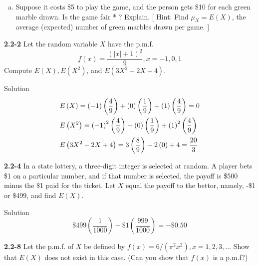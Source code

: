 \documentclass{article}
\begin{document}
\begin{spacing}{1.1}
\begin{homeworkProblem}
\begin{enumerate}[(a)]
\begin{homeworkSection}{Solution}
			\end{homeworkSection}
		\item Suppose it costs \$5 to play the game, and the person gets \$10 for each green marble
drawn. Is the game fair * ? Explain. [ Hint: Find  $\mu_X = E(X)$, the average (expected) number of green marbles drawn per game. ]
	\end{enumerate}
\end{homeworkProblem}
\begin{homeworkProblem}
	{\bf 2.2-2}	Let the random variable $X$ have the p.m.f. 
	\[f\left( x \right) = \frac{{{{\left( {\left| x \right| + 1} \right)}^2}}}{9},x =  - 1,0,1\]
	Compute $E(X),E(X^2)$, and $E(3X^2 - 2X +4)$.
	\begin{homeworkSection}{Solution}
		\[\begin{gathered}
  E\left( X \right) = \left( { - 1} \right)\left( {\frac{4}{9}} \right) + \left( 0 \right)\left( {\frac{1}{9}} \right) + \left( 1 \right)\left( {\frac{4}{9}} \right) = 0 \hfill \\
  E\left( {{X^2}} \right) = {\left( { - 1} \right)^2}\left( {\frac{4}{9}} \right) + \left( 0 \right)\left( {\frac{1}{9}} \right) + {\left( 1 \right)^2}\left( {\frac{4}{9}} \right) \hfill \\
  E\left( {3{X^2} - 2X + 4} \right) = 3\left( {\frac{8}{9}} \right) - 2\left( 0 \right) + 4 = \frac{{20}}{3} \hfill \\ 
\end{gathered} \]
	\end{homeworkSection}
\end{homeworkProblem}
\begin{homeworkProblem}
	{\bf 2.2-4} In a state lottery, a three-digit integer is selected at random.  A player bets \$1 on a particular number, and if that number is selected, the payoff is \$500 minus the \$1 paid for the ticket.  Let $X$ equal the payoff to the bettor, namely, -\$1 or \$499, and find $E(X)$.  
	\begin{homeworkSection}{Solution}
		\[\$ 499\left( {\frac{1}{{1000}}} \right) - \$ 1\left( {\frac{{999}}{{1000}}} \right) =  - \$ 0.50\]
	\end{homeworkSection}
\end{homeworkProblem}
\begin{homeworkProblem}
	{\bf 2.2-8}	Let the p.m.f. of $X$ be defined by $f(x) = 6/(\pi^2 x^2), x = 1, 2, 3, \dots$ Show that $E(X)$ does not exist in this case.  (Can you show that $f(x)$ is a p.m.f?)

\end{homeworkProblem}
\end{spacing}
\end{document}
